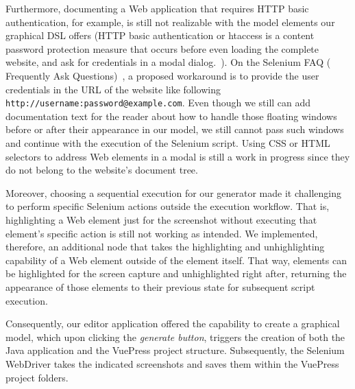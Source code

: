 Furthermore, documenting a Web application that requires HTTP basic authentication, for example, is still not realizable with the model elements our graphical DSL offers (HTTP basic authentication or htaccess is a content password protection measure that occurs before even loading the complete website, and ask for credentials in a modal dialog.~\cite{htaccess}). On the Selenium FAQ ( Frequently Ask Questions)~\cite{StackOverflow}, a proposed workaround is to provide the user credentials in the URL of the website like following \lstinline{http://username:password@example.com}. Even though we still can add documentation text for the reader about how to handle those floating windows before or after their appearance in our model, we still cannot pass such windows and continue with the execution of the Selenium script. Using CSS or HTML selectors to address Web elements in a modal is still a work in progress since they do not belong to the website's document tree.

Moreover, choosing a sequential execution for our generator made it challenging to perform specific Selenium actions outside the execution workflow. That is, highlighting a Web element just for the screenshot without executing that element's specific action is still not working as intended. We implemented, therefore, an additional node that takes the highlighting and unhighlighting capability of a Web element outside of the element itself. That way, elements can be highlighted for the screen capture and unhighlighted right after, returning the appearance of those elements to their previous state for subsequent script execution. 

Consequently, our editor application offered the capability to create a graphical model, which upon clicking the \textit{generate button}, triggers the creation of both the Java application and the VuePress project structure. Subsequently, the Selenium WebDriver takes the indicated screenshots and saves them within the VuePress project folders.